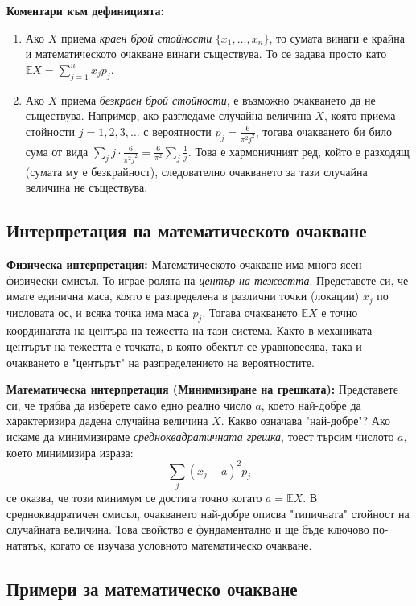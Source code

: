 \documentclass{article}
\begin{document}
\textbf{Коментари към дефиницията:}
\begin{enumerate}
    \item Ако $X$ приема \textit{краен брой стойности} $\{x_1, \dots, x_n\}$, то сумата винаги е крайна и математическото очакване винаги съществува. То се задава просто като $\mathbb{E}X = \sum_{j=1}^n x_j p_j$.
    \item Ако $X$ приема \textit{безкраен брой стойности}, е възможно очакването да не съществува. Например, ако разгледаме случайна величина $X$, която приема стойности $j = 1, 2, 3, \dots$ с вероятности $p_j = \frac{6}{\pi^2 j^2}$, тогава очакването би било сума от вида $\sum_{j} j \cdot \frac{6}{\pi^2 j^2} = \frac{6}{\pi^2} \sum_{j} \frac{1}{j}$. Това е хармоничният ред, който е разходящ (сумата му е безкрайност), следователно очакването за тази случайна величина не съществува.
\end{enumerate}

\subsection{Интерпретация на математическото очакване}

\textbf{Физическа интерпретация:} Математическото очакване има много ясен физически смисъл. То играе ролята на \textit{център на тежестта}. Представете си, че имате единична маса, която е разпределена в различни точки (локации) $x_j$ по числовата ос, и всяка точка има маса $p_j$. Тогава очакването $\mathbb{E}X$ е точно координатата на центъра на тежестта на тази система. Както в механиката центърът на тежестта е точката, в която обектът се уравновесява, така и очакването е "центърът" на разпределението на вероятностите.

\textbf{Математическа интерпретация (Минимизиране на грешката):} Представете си, че трябва да изберете само едно реално число $a$, което най-добре да характеризира дадена случайна величина $X$. Какво означава "най-добре"? Ако искаме да минимизираме \textit{средноквадратичната грешка}, тоест търсим числото $a$, което минимизира израза:
\[ \sum_{j} (x_j - a)^2 p_j \]
се оказва, че този минимум се достига точно когато $a = \mathbb{E}X$. В средноквадратичен смисъл, очакването най-добре описва "типичната" стойност на случайната величина. Това свойство е фундаментално и ще бъде ключово по-нататък, когато се изучава условното математическо очакване.

\subsection{Примери за математическо очакване}
\end{document}

